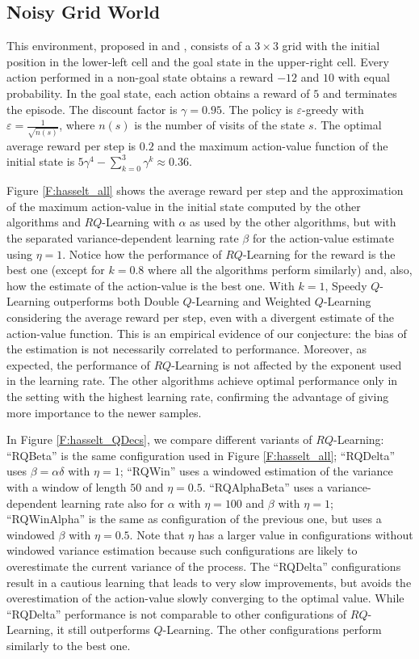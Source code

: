 \subsection{Noisy Grid World}
This environment, proposed in \cite{van2010double}  and \cite{deramo2016estimating}, consists of a $3 \times 3$ grid with the initial position in the lower-left cell and the goal state in the upper-right cell. Every action performed in a non-goal state obtains a reward $-12$ and $10$ with equal probability. In the goal state, each action obtains a reward of $5$ and terminates the episode. The discount factor is $\gamma = 0.95$. The policy is $\varepsilon$-greedy with $\varepsilon = \frac{1}{\sqrt{n(s)}}$, where $n(s)$ is the number of  visits of the state $s$. The optimal average reward per step is $0.2$ and the maximum action-value function of the initial state is $5\gamma^4 - \sum_{k=0}^3 \gamma^k \approx 0.36$.

Figure \ref{F:hasselt_all} shows the average reward per step and the approximation of the maximum action-value in the initial state computed by the other algorithms and $RQ$-Learning with $\alpha$ as used by the other algorithms, but with the separated variance-dependent learning rate $\beta$ for the action-value estimate using $\eta = 1$. Notice how the performance of $RQ$-Learning for the reward is the best one (except for $k=0.8$ where all the algorithms perform similarly) and, also, how the estimate of the action-value is the best one. With $k=1$, Speedy $Q$-Learning outperforms both Double $Q$-Learning and Weighted $Q$-Learning considering the average reward per step, even with a divergent estimate of the action-value function. This is an empirical evidence of our conjecture: the bias of the estimation is not necessarily correlated to performance. Moreover, as expected, the performance of $RQ$-Learning is not affected by the exponent used in the learning rate. The other algorithms achieve optimal performance only in the setting with the highest learning rate, confirming the advantage of giving more importance to the newer samples.

In Figure \ref{F:hasselt_QDecs}, we compare different variants of $RQ$-Learning: ``RQBeta'' is the same configuration used in Figure \ref{F:hasselt_all}; ``RQDelta'' uses $\beta = \alpha \delta$ with $\eta = 1$; ``RQWin'' uses a windowed estimation of the variance with a window of length $50$ and $\eta = 0.5$. ``RQAlphaBeta'' uses a variance-dependent learning rate also for $\alpha$ with $\eta = 100$ and $\beta$ with $\eta = 1$; ``RQWinAlpha'' is the same as configuration of the previous one, but uses a windowed $\beta$ with $\eta = 0.5$. Note that $\eta$ has a larger value in configurations without windowed variance estimation because such configurations are likely to overestimate the current variance of the process. The ``RQDelta'' configurations result in a cautious learning that leads to very slow improvements, but avoids the overestimation of the action-value slowly converging to the optimal value. While ``RQDelta'' performance is not comparable to other configurations of $RQ$-Learning, it still outperforms $Q$-Learning. The other configurations perform similarly to the best one.

